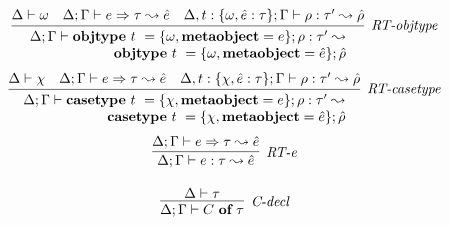 


\begin{figure}
\centering
\[
\begin{array}{c}

\infer[\textit{RT-objtype}]
          {\renewcommand{\arraystretch}{1}
	    \begin{array}{r}
	    \Delta; \Gamma \vdash  \keyw{objtype}~ t~=\{{\omega}, \keyw{metaobject}=e\}; \rho: \tau'\leadsto\\
            \keyw{objtype}~ t~=\{{\omega}, \keyw{metaobject}=\hat{e}\}; \hat{\rho}
            \end{array}
       }
	  {\Delta \vdash \omega & \Delta; \Gamma \vdash e \Rightarrow \tau \leadsto \hat{e} & \Delta, t:\{\omega, \hat e:\tau\}; \Gamma \vdash \rho :\tau'\leadsto \hat{\rho} }
	   \\[3ex] 


\infer[\textit{RT-casetype}]
          {\renewcommand{\arraystretch}{1}
	    \begin{array}{r}
	    \Delta; \Gamma \vdash  \keyw{casetype}~ t~=\{\chi, \keyw{metaobject}=e\}; \rho :\tau' \leadsto \\
            \keyw{casetype}~ t~=\{\chi, \keyw{metaobject}=\hat{e}\};\hat{\rho}
            \end{array}
       }
	  {\Delta \vdash \chi & \Delta; \Gamma \vdash e \Rightarrow \tau \leadsto \hat{e} & \Delta, t:\{\chi, \hat e:\tau\}; \Gamma \vdash \rho :\tau'\leadsto \hat{\rho} }
	   \\[3ex] 


\infer[\textit{RT-e}]
	{\Delta; \Gamma \vdash  e:\tau \leadsto \hat{e}} 
	{\Delta; \Gamma \vdash e \Rightarrow \tau \leadsto \hat{e}}\\[3ex]

\infer[\textit{C-decl}]
	{\Delta; \Gamma \vdash  C~\keyw{of}~\tau} 
	{\Delta \vdash \tau   }\\[3ex]


\end{array}\]
\end{figure}
